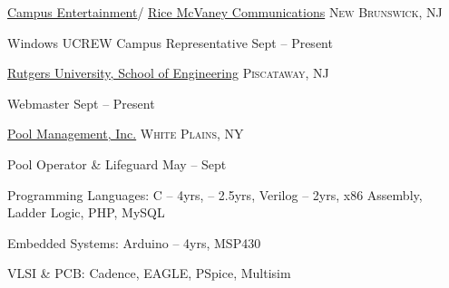\documentclass[10pt,a4paper]{article}
\begin{document}
	\headedsection
		{\href{http://www.campusentertainment.net}{Campus Entertainment}/ 	
		\href{http://ricemcvaneycommunications.com}{Rice McVaney Communications}}
		{\textsc{New Brunswick, NJ}} {%
	
	\headedsubsection
		{Windows UCREW Campus Representative}
		{Sept  -- Present}
		{}
}

	\headedsection
		{\href{http://soe.rutgers.edu}{Rutgers University, School of Engineering}}
		{\textsc{Piscataway, NJ}} {%

	\headedsubsection
		{Webmaster}
		{Sept  -- Present}
		{}
}

	\headedsection
		{\href{http://www.redcross.org/take-a-class/program-highlights/lifeguarding}{Pool Management, Inc.}}
		{\textsc{White Plains, NY}} {%

	\headedsubsection
		{Pool Operator \& Lifeguard}
		{May  -- Sept }
		{}
}

\spacedhrule{1.6em}{-0.4em}

	\inlineheadsection %
		{Programming Languages:}
		{C -- 4yrs, \CPP -- 2.5yrs, Verilog -- 2yrs, x86 Assembly, Ladder Logic, PHP, MySQL}

	\inlineheadsection
		{Embedded Systems:}
		{Arduino -- 4yrs, MSP430}

	\inlineheadsection
		{VLSI \& PCB:}
		{Cadence, EAGLE, PSpice, Multisim}

\spacedhrule{1.6em}{-0.4em}
\end{document}
